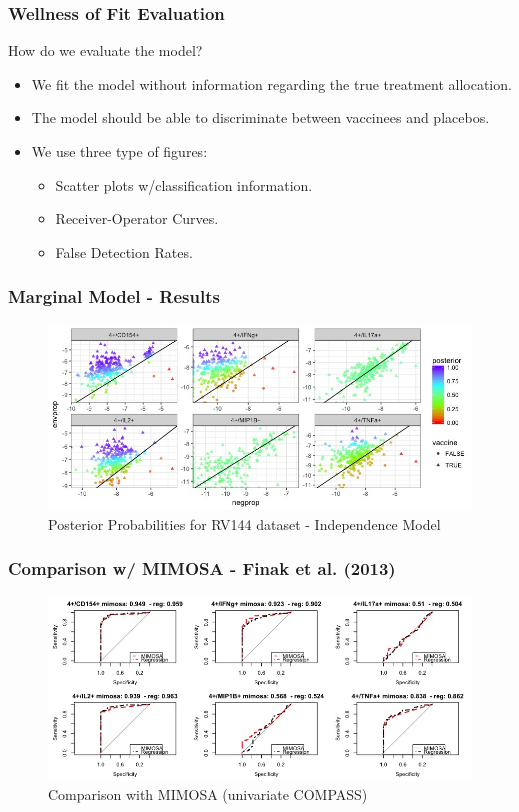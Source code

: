 \documentclass{beamer}
\theoremstyle{definition}
\begin{document}

\begin{frame}
\frametitle{Wellness of Fit Evaluation}
How do we evaluate the model?
\begin{itemize}
\item We fit the model without information regarding the true treatment allocation. 
\vspace{0.3 cm}
\item The model should be able to discriminate between vaccinees and placebos.
\vspace{0.3 cm}
\pause
\item We use three type of figures:
	\begin{itemize}
	\item Scatter plots w/classification information.
	\item Receiver-Operator Curves.
	\item False Detection Rates. 
	\end{itemize}
\end{itemize}
\end{frame}


\begin{frame}
\frametitle{Marginal Model - Results}
\begin{center}
\begin{figure}[]
\includegraphics[width=12 cm]{figures/marginalBooleansIndependenceScatter}
 \caption{Posterior Probabilities for RV144 dataset - Independence Model}
\end{figure}
\end{center}
\end{frame}


\begin{frame}
\frametitle{Comparison w/ MIMOSA - Finak et al. (2013) }
\begin{figure}[]
\includegraphics[width=11 cm]{figures/mimosaComparisonROC} 
\caption{Comparison with MIMOSA (univariate COMPASS)}
\end{figure}
\end{frame}
\end{document}
